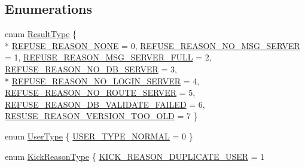 \subsection*{Enumerations}
\begin{DoxyCompactItemize}
\item 
enum \hyperlink{namespace_i_m_1_1_base_define_a1ff972f1012ff296dacbebee9e66e70f}{Result\+Type} \{ \\*
\hyperlink{namespace_i_m_1_1_base_define_a1ff972f1012ff296dacbebee9e66e70fafc1f345a4d4c33b001fb2c2ff0027ee6}{R\+E\+F\+U\+S\+E\+\_\+\+R\+E\+A\+S\+O\+N\+\_\+\+N\+O\+N\+E} = 0, 
\hyperlink{namespace_i_m_1_1_base_define_a1ff972f1012ff296dacbebee9e66e70fa1b1df56fc0077cc2182e074f2ca14c5a}{R\+E\+F\+U\+S\+E\+\_\+\+R\+E\+A\+S\+O\+N\+\_\+\+N\+O\+\_\+\+M\+S\+G\+\_\+\+S\+E\+R\+V\+E\+R} = 1, 
\hyperlink{namespace_i_m_1_1_base_define_a1ff972f1012ff296dacbebee9e66e70fa547c2292f1da640dc185aa6f3b4f11bf}{R\+E\+F\+U\+S\+E\+\_\+\+R\+E\+A\+S\+O\+N\+\_\+\+M\+S\+G\+\_\+\+S\+E\+R\+V\+E\+R\+\_\+\+F\+U\+L\+L} = 2, 
\hyperlink{namespace_i_m_1_1_base_define_a1ff972f1012ff296dacbebee9e66e70fa91d9f4c63e202526208663d0c6b7d7d1}{R\+E\+F\+U\+S\+E\+\_\+\+R\+E\+A\+S\+O\+N\+\_\+\+N\+O\+\_\+\+D\+B\+\_\+\+S\+E\+R\+V\+E\+R} = 3, 
\\*
\hyperlink{namespace_i_m_1_1_base_define_a1ff972f1012ff296dacbebee9e66e70fabe2e8d1a0683676df5e660a19f86eeb0}{R\+E\+F\+U\+S\+E\+\_\+\+R\+E\+A\+S\+O\+N\+\_\+\+N\+O\+\_\+\+L\+O\+G\+I\+N\+\_\+\+S\+E\+R\+V\+E\+R} = 4, 
\hyperlink{namespace_i_m_1_1_base_define_a1ff972f1012ff296dacbebee9e66e70fa10e8391d1fa42eae016b3de5622b862c}{R\+E\+F\+U\+S\+E\+\_\+\+R\+E\+A\+S\+O\+N\+\_\+\+N\+O\+\_\+\+R\+O\+U\+T\+E\+\_\+\+S\+E\+R\+V\+E\+R} = 5, 
\hyperlink{namespace_i_m_1_1_base_define_a1ff972f1012ff296dacbebee9e66e70fa857a3957b410769353ce423b478a1060}{R\+E\+F\+U\+S\+E\+\_\+\+R\+E\+A\+S\+O\+N\+\_\+\+D\+B\+\_\+\+V\+A\+L\+I\+D\+A\+T\+E\+\_\+\+F\+A\+I\+L\+E\+D} = 6, 
\hyperlink{namespace_i_m_1_1_base_define_a1ff972f1012ff296dacbebee9e66e70fa2698b78bb98be5a1e2807f36c8acb3be}{R\+E\+S\+U\+S\+E\+\_\+\+R\+E\+A\+S\+O\+N\+\_\+\+V\+E\+R\+S\+I\+O\+N\+\_\+\+T\+O\+O\+\_\+\+O\+L\+D} = 7
 \}
\item 
enum \hyperlink{namespace_i_m_1_1_base_define_a6e0b9bb7c94e3e0e512f9dc7ca69cb83}{User\+Type} \{ \hyperlink{namespace_i_m_1_1_base_define_a6e0b9bb7c94e3e0e512f9dc7ca69cb83a1b935e8acccdb9dc59e805cbddc711f3}{U\+S\+E\+R\+\_\+\+T\+Y\+P\+E\+\_\+\+N\+O\+R\+M\+A\+L} = 0
 \}
\item 
enum \hyperlink{namespace_i_m_1_1_base_define_a7ac3ce0aff5b2d7dec30a6876d9e6b75}{Kick\+Reason\+Type} \{ \hyperlink{namespace_i_m_1_1_base_define_a7ac3ce0aff5b2d7dec30a6876d9e6b75a6182a8a201db91eb853c68757a602b8e}{K\+I\+C\+K\+\_\+\+R\+E\+A\+S\+O\+N\+\_\+\+D\+U\+P\+L\+I\+C\+A\+T\+E\+\_\+\+U\+S\+E\+R} = 1

\end{DoxyCompactItemize}
